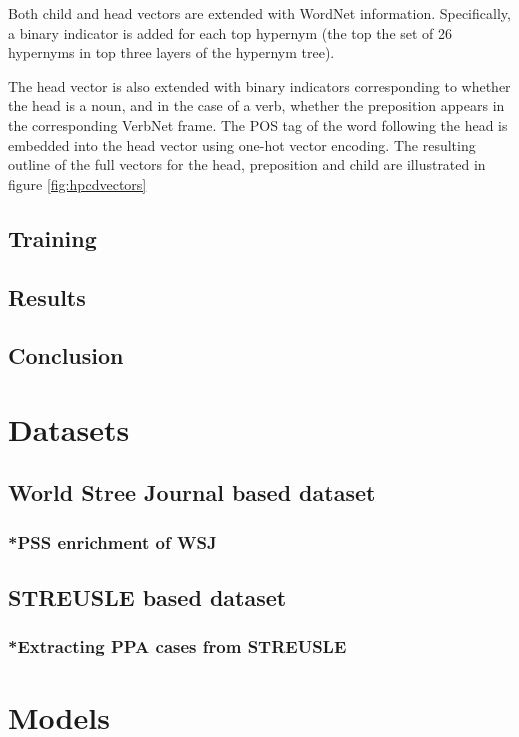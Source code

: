 Both child and head vectors are extended with WordNet information. Specifically, a binary indicator is added for each top hypernym (the top the set of 26 hypernyms in top three layers of the hypernym tree). 

The head vector is also extended with binary indicators corresponding to whether the head is a noun, and in the case of a verb, whether the preposition appears in the corresponding VerbNet frame. The POS tag of the word following the head is embedded into the head vector using one-hot vector encoding. The resulting outline of the full vectors for the head, preposition and child are illustrated in figure \ref{fig:hpcdvectors}

\subsection{Training}
\subsection{Results}
\subsection{Conclusion}
\pagebreak

\section{Datasets}
\subsection{World Stree Journal based dataset}
\subsubsection{*PSS enrichment of WSJ}
\subsection{STREUSLE based dataset}
\subsubsection{*Extracting PPA cases from STREUSLE}

\section{Models}
